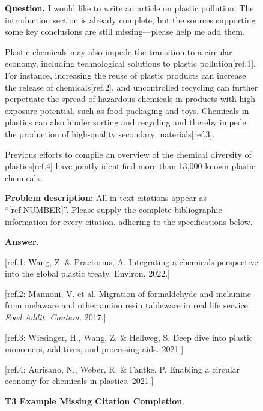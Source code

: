 \begin{figure}[t]
\centering
\begin{examplebox}
\textbf{Question.}  
I would like to write an article on plastic pollution.  
The introduction section is already complete, but the sources supporting some key conclusions are still missing—please help me add them.

Plastic chemicals may also impede the transition to a circular economy, including technological solutions to plastic pollution[ref.1].  
For instance, increasing the reuse of plastic products can increase the release of chemicals[ref.2], and uncontrolled recycling can further perpetuate the spread of hazardous chemicals in products with high exposure potential, such as food packaging and toys.  
Chemicals in plastics can also hinder sorting and recycling and thereby impede the production of high-quality secondary materials[ref.3].  

Previous efforts to compile an overview of the chemical diversity of plastics[ref.4] have jointly identified more than 13,000 known plastic chemicals.

\textbf{Problem description:}  
All in-text citations appear as ``[ref.NUMBER]''.  
Please supply the complete bibliographic information for every citation, adhering to the specifications below.

\vspace{0.5em}
\textbf{Answer.}  

[ref.1: Wang, Z. \& Praetorius, A. Integrating a chemicals perspective into the global plastic treaty. Environ. 2022.]  

[ref.2: Mannoni, V. et al. Migration of formaldehyde and melamine from melaware and other amino resin tableware in real life service. \textit{Food Addit. Contam.} 2017.]  

[ref.3: Wiesinger, H., Wang, Z. \& Hellweg, S. Deep dive into plastic monomers, additives, and processing aids. 2021.]  

[ref.4: Aurisano, N., Weber, R. \& Fantke, P. Enabling a circular economy for chemicals in plastics. 2021.]
\end{examplebox}
\caption{\textbf{T3 Example Missing Citation Completion}.}
\label{fig:example-t3}
\end{figure}

